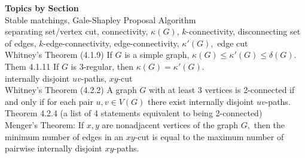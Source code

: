 \documentclass[12pt]{article}
\theoremstyle{homework}
\begin{document}
\noindent \textbf{Topics by Section}\\

  Stable matchings, Gale-Shapley Proposal Algorithm\\

 separating set/vertex cut, connectivity, $\kappa(G)$, $k$-connectivity, disconnecting set of edges, $k$-edge-connectivity, edge-connectivity, $\kappa'(G),$ edge cut\\

Whitney's Theorem (4.1.9) If $G$ is a simple graph, $\kappa(G) \leq \kappa'(G) \leq \delta(G).$\\

Them 4.1.11 If $G$ is 3-regular, then $\kappa(G) = \kappa'(G).$\\

 internally disjoint $uv$-paths, $xy$-cut\\

Whitney's Theorem (4.2.2) A graph $G$ with at least 3 vertices is 2-connected if and only if for each pair $u,v \in V(G)$ there exist internally disjoint $uv$-paths.\\

Theorem 4.2.4 (a list of 4 statements equivalent to being 2-connected)\\

Menger's Theorem: If $x,y$ are nonadjacent vertices of the graph $G,$ then the minimum number of edges in an $xy$-cut is equal to the maximum number of pairwise internally disjoint $xy$-paths.
\end{document}
